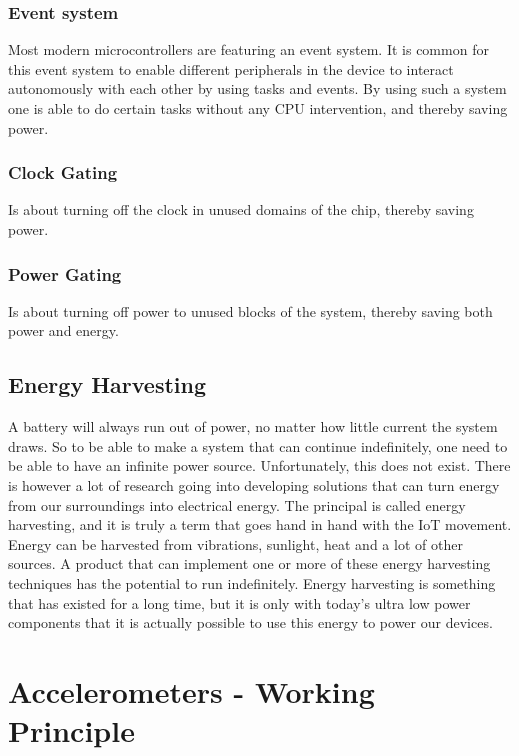 \subsubsection{Event system}

Most modern microcontrollers are featuring an event system. It is common for this event system to enable different peripherals in the device to interact autonomously with each other by using tasks and events. By using such a system one is able to do certain tasks without any CPU intervention, and thereby saving power.

\subsubsection{Clock Gating}

Is about turning off the clock in unused domains of the chip, thereby saving power.

\subsubsection{Power Gating}

Is about turning off power to unused blocks of the system, thereby saving both power and energy. 

\subsection{Energy Harvesting}

A battery will always run out of power, no matter how little current the system draws. So to be able to make a system that can continue indefinitely, one need to be able to have an infinite power source. Unfortunately, this does not exist. There is however a lot of research going into developing solutions that can turn energy from our surroundings into electrical energy. The principal is called energy harvesting, and it is truly a term that goes hand in hand with the IoT movement. Energy can be harvested from vibrations, sunlight, heat and a lot of other sources. A product that can implement one or more of these energy harvesting techniques has the potential to run indefinitely. Energy harvesting is something that has existed for a long time, but it is only with today's ultra low power components that it is actually possible to use this energy to power our devices.

\section{Accelerometers - Working Principle} \label{sec:accel_working_principle}

